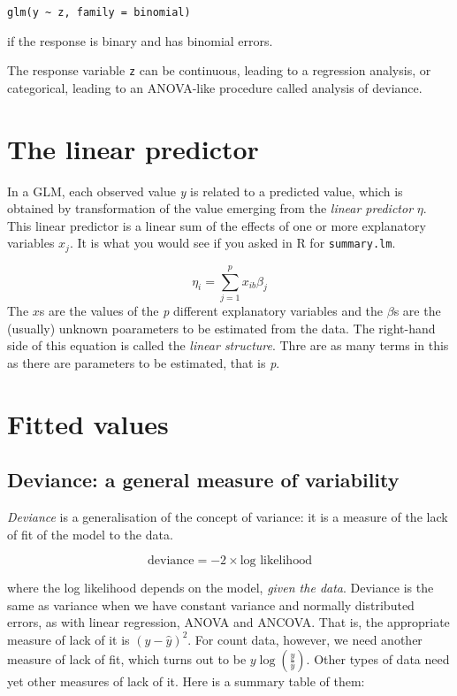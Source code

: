 \documentclass[
  letterpaper,
  DIV=11,
  numbers=noendperiod]{scrreprt}
\begin{document}
\texttt{glm(y\ \textasciitilde{}\ z,\ family\ =\ binomial)}

if the response is binary and has binomial errors.

The response variable \texttt{z} can be continuous, leading to a
regression analysis, or categorical, leading to an ANOVA-like procedure
called analysis of deviance.

\section{The linear predictor}\label{the-linear-predictor}

In a GLM, each observed value \emph{y} is related to a predicted value,
which is obtained by transformation of the value emerging from the
\emph{linear predictor} \(\eta\). This linear predictor is a linear sum
of the effects of one or more explanatory variables \(x_j\). It is what
you would see if you asked in R for \texttt{summary.lm}.

\[\eta_i = \sum_{j=1}^px_{ib}\beta_j\] The \(x\)s are the values of the
\emph{p} different explanatory variables and the \(\beta\)s are the
(usually) unknown poarameters to be estimated from the data. The
right-hand side of this equation is called the \emph{linear structure}.
Thre are as many terms in this as there are parameters to be estimated,
that is \emph{p}.

\section{Fitted values}\label{fitted-values}

\subsection{Deviance: a general measure of
variability}\label{deviance-a-general-measure-of-variability}

\emph{Deviance} is a generalisation of the concept of variance: it is a
measure of the lack of fit of the model to the data.

\[\text{deviance} = -2\times\text{log likelihood}\]

where the log likelihood depends on the model, \emph{given the data}.
Deviance is the same as variance when we have constant variance and
normally distributed errors, as with linear regression, ANOVA and
ANCOVA. That is, the appropriate measure of lack of it is
\((y-\hat{y})^2\). For count data, however, we need another measure of
lack of fit, which turns out to be \(y\log(\frac{y}{\hat{y}})\). Other
types of data need yet other measures of lack of it. Here is a summary
table of them:
\end{document}
